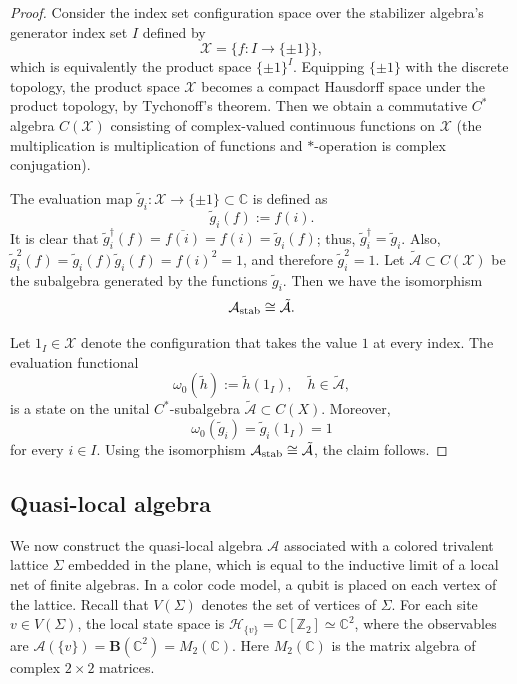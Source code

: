 \documentclass[a4paper,11pt]{article}
\theoremstyle{definition}
\theoremstyle{remark}
\theoremstyle{remark}
\begin{document}
\begin{proof}

Consider the index set configuration space over the stabilizer algebra's generator index set $I$ defined by 
\[
\mathcal{X} = \{ f : I \to \{\pm 1\} \},
\]
which is equivalently the product space $\{\pm 1\}^I$.  
Equipping $\{\pm 1\}$ with the discrete topology, the product space $\mathcal{X}$ becomes a compact Hausdorff space under the product topology, by Tychonoff’s theorem.
Then we obtain a commutative $C^*$ algebra $C(\mathcal{X})$ consisting of complex-valued continuous functions on $\mathcal{X}$ (the multiplication is multiplication of functions and $*$-operation is complex conjugation).

The evaluation map $\tilde{g}_i:\mathcal{X} \to \{\pm 1\}\subset \mathbb{C}$ is defined as
\[
\tilde{g}_i(f):=f(i).
\]
It is clear that $\tilde{g}_i^\dagger(f)=\overline{f(i)} =f(i) =\tilde{g}_i(f)$; thus, $\tilde{g}_i^\dagger=\tilde{g}_i$. Also, $\tilde{g}_i^2(f)= \tilde{g}_i(f) \tilde{g}_i(f)=f(i)^2 = 1$, and therefore $\tilde{g}_i^2 = 1$.
Let $\tilde{\mathcal A}\subset C(\mathcal{X})$ be the subalgebra generated by the functions $\tilde g_i$. Then we have the isomorphism
\[
\mathcal{A}_{\rm stab}  \cong \tilde{\mathcal{A}}.
\]

Let $1_I\in \mathcal{X}$ denote the configuration that takes the value $1$ at every index. The evaluation functional
\[
    \omega_0(\tilde h):=\tilde h(1_I),\quad \tilde h\in\tilde{\mathcal A},
\]
is a state on the unital $C^*$-subalgebra $\tilde{\mathcal A}\subset C(X)$. Moreover,
\[
    \omega_0(\tilde g_i)=\tilde g_i(1_I)=1
\]
for every $i\in I$. Using the isomorphism $\mathcal A_{\rm stab}\cong\tilde{\mathcal A}$, the claim follows.
\end{proof}




\subsection{Quasi-local algebra}






We now construct the quasi-local algebra $\mathcal{A}$ associated with a colored trivalent lattice $\Sigma$ embedded in the plane, which is equal to the inductive limit of a local net of finite algebras. 
In a color code model, a qubit is placed on each vertex of the lattice. 
Recall that $V(\Sigma)$ denotes the set of vertices of $\Sigma$. 
For each site $v\in V(\Sigma)$, the local state space is $\mathcal{H}_{\{v\}} = \mathbb{C}[\mathbb{Z}_2]\simeq \mathbb{C}^2$, where the observables are $\mathcal{A}(\{v\}) = \mathbf{B}(\mathbb{C}^2) = M_2(\mathbb{C})$. Here $M_2(\mathbb{C})$ is the matrix algebra of complex $2\times 2$ matrices. 
\end{document}
